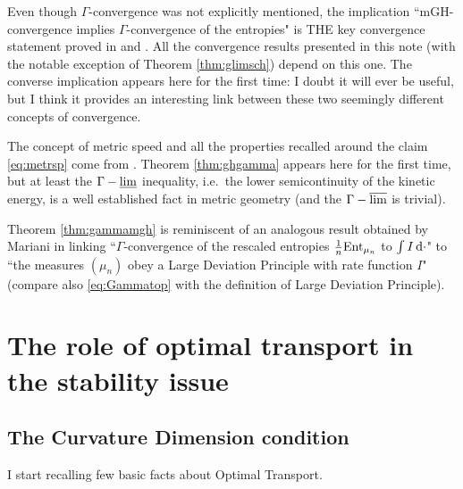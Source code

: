 \documentclass[11pt]{article}
\numberwithin{equation}{section}
\newcommand{\entm}[1]{{\rm Ent}_{#1}}
\renewcommand{\d}{{\rm d}}
\newcommand{\lims}{\varlimsup}
\newcommand{\limi}{\varliminf}
\DeclareMathOperator*{\glimi}{{\Gamma-\limi}}
\DeclareMathOperator*{\glims}{\Gamma-\lims}
\begin{document}
{{Even though $\Gamma$-convergence was not explicitly mentioned, the implication ``mGH-convergence implies $\Gamma$-convergence of the entropies" is THE key convergence statement proved in \cite{Lott-Villani09}  and  \cite{Sturm06I}. All the convergence results presented in this note (with the notable exception of Theorem \ref{thm:glimsch}) depend on this one. The converse implication appears here for the first time:   I doubt it will ever be useful, but I think it provides an interesting link between these two seemingly different concepts of convergence.  

The concept of metric speed and all the properties recalled around the claim \eqref{eq:metrsp} come from \cite{Ambr90}. Theorem \ref{thm:ghgamma}  appears here for the first time, but at least the $\glimi$ inequality, i.e.\ the lower semicontinuity of the kinetic energy, is a well established fact in metric geometry (and the $\glims$ is trivial).


Theorem \ref{thm:gammamgh} is reminiscent of an analogous result obtained by Mariani in \cite{mariani} linking ``$\Gamma$-convergence of the rescaled entropies $\frac1n\entm{\mu_n}$ to $\int I\,\d\cdot$" to ``the measures $(\mu_n)$ obey a Large Deviation Principle with rate function $I$" (compare also \eqref{eq:Gammatop} with the definition of Large Deviation Principle).
}
}

\section{The role of optimal transport in the stability issue}\label{ch:stab1}
\subsection{The Curvature Dimension condition}
I start recalling few basic facts about Optimal Transport.
\end{document}
